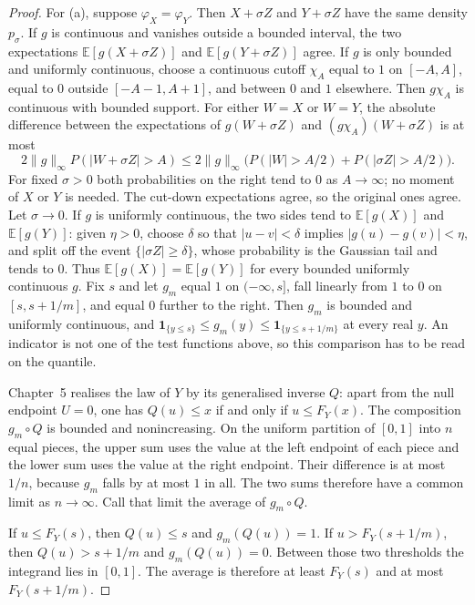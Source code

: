 \begin{proof}
For (a), suppose $\varphi_X=\varphi_Y$. Then $X+\sigma Z$ and $Y+\sigma Z$ have the same density $p_\sigma$. If $g$ is continuous and vanishes outside a bounded interval, the two expectations $\mathbb E[g(X+\sigma Z)]$ and $\mathbb E[g(Y+\sigma Z)]$ agree. If $g$ is only bounded and uniformly continuous, choose a continuous cutoff $\chi_A$ equal to $1$ on $[-A,A]$, equal to $0$ outside $[-A-1,A+1]$, and between $0$ and $1$ elsewhere. Then $g\chi_A$ is continuous with bounded support. For either $W=X$ or $W=Y$, the absolute difference between the expectations of $g(W+\sigma Z)$ and $(g\chi_A)(W+\sigma Z)$ is at most
\[
 2\|g\|_\infty P(|W+\sigma Z|>A)
 \le 2\|g\|_\infty\bigl(P(|W|>A/2)+P(|\sigma Z|>A/2)\bigr).
\]
For fixed $\sigma>0$ both probabilities on the right tend to $0$ as $A\to\infty$; no moment of $X$ or $Y$ is needed. The cut-down expectations agree, so the original ones agree. Let $\sigma\to0$. If $g$ is uniformly continuous, the two sides tend to $\mathbb E[g(X)]$ and $\mathbb E[g(Y)]$: given $\eta>0$, choose $\delta$ so that $|u-v|<\delta$ implies $|g(u)-g(v)|<\eta$, and split off the event $\{|\sigma Z|\ge\delta\}$, whose probability is the Gaussian tail and tends to $0$. Thus $\mathbb E[g(X)]=\mathbb E[g(Y)]$ for every bounded uniformly continuous $g$. Fix $s$ and let $g_m$ equal $1$ on $(-\infty,s]$, fall linearly from $1$ to $0$ on $[s,s+1/m]$, and equal $0$ further to the right. Then $g_m$ is bounded and uniformly continuous, and $\mathbf 1_{\{y\le s\}}\le g_m(y)\le\mathbf 1_{\{y\le s+1/m\}}$ at every real $y$. An indicator is not one of the test functions above, so this comparison has to be read on the quantile.

Chapter~5 realises the law of $Y$ by its generalised inverse $Q$: apart from the null endpoint $U=0$, one has $Q(u)\le x$ if and only if $u\le F_Y(x)$. The composition $g_m\circ Q$ is bounded and nonincreasing. On the uniform partition of $[0,1]$ into $n$ equal pieces, the upper sum uses the value at the left endpoint of each piece and the lower sum uses the value at the right endpoint. Their difference is at most $1/n$, because $g_m$ falls by at most $1$ in all. The two sums therefore have a common limit as $n\to\infty$. Call that limit the average of $g_m\circ Q$.

If $u\le F_Y(s)$, then $Q(u)\le s$ and $g_m(Q(u))=1$. If $u>F_Y(s+1/m)$, then $Q(u)>s+1/m$ and $g_m(Q(u))=0$. Between those two thresholds the integrand lies in $[0,1]$. The average is therefore at least $F_Y(s)$ and at most $F_Y(s+1/m)$.


\end{proof}
